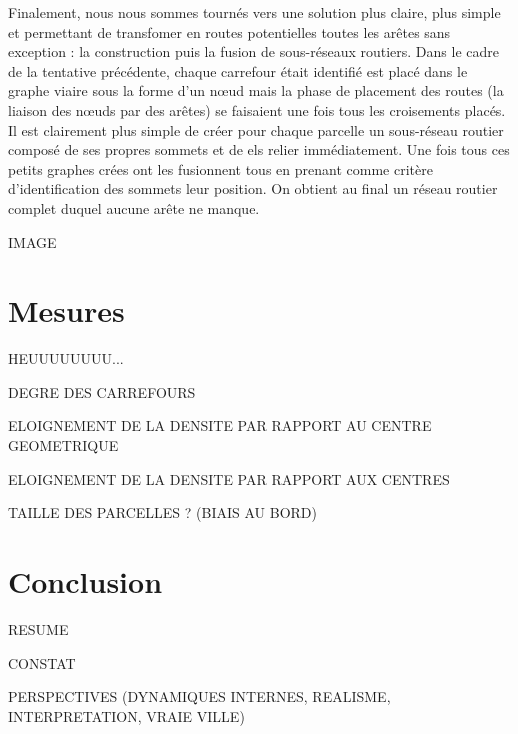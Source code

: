 \documentclass[12pt]{article}
\begin{document}
Finalement, nous nous sommes tournés vers une solution plus claire,
plus simple et permettant de transfomer en routes potentielles toutes
les arêtes sans exception : la construction puis la fusion de
sous-réseaux routiers. Dans le cadre de la tentative précédente,
chaque carrefour était identifié est placé dans le graphe viaire sous
la forme d'un n\oe ud mais la phase de placement des routes (la
liaison des n\oe uds par des arêtes) se faisaient une fois tous les
croisements placés. Il est clairement plus simple de créer pour chaque
parcelle un sous-réseau routier composé de ses propres sommets et de
els relier immédiatement. Une fois tous ces petits graphes crées ont
les fusionnent tous en prenant comme critère d'identification des
sommets leur position. On obtient au final un réseau routier complet
duquel aucune arête ne manque.

IMAGE

\section{Mesures}

HEUUUUUUUU...

DEGRE DES CARREFOURS

ELOIGNEMENT DE LA DENSITE PAR RAPPORT AU CENTRE GEOMETRIQUE

ELOIGNEMENT DE LA DENSITE PAR RAPPORT AUX CENTRES

TAILLE DES PARCELLES ? (BIAIS AU BORD)

\section{Conclusion}

RESUME

CONSTAT

PERSPECTIVES (DYNAMIQUES INTERNES, REALISME, INTERPRETATION, VRAIE VILLE)

\printbibliography
\end{document}
